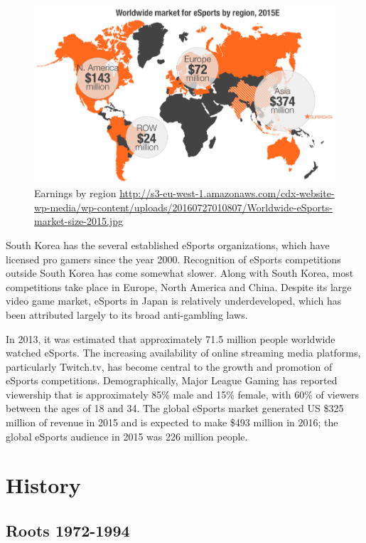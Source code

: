 \begin{figure}[!h]
	\begin{center}
		\includegraphics[width=0.68\linewidth]{images/esport_market}
		\caption{Earnings by region \url{http://s3-eu-west-1.amazonaws.com/cdx-website-wp-media/wp-content/uploads/20160727010807/Worldwide-eSports-market-size-2015.jpg}}
	\end{center}
\end{figure}
\newpage

South Korea has the several established eSports organizations, which have licensed pro gamers since the year 2000. Recognition of eSports competitions outside South Korea has come somewhat slower. Along with South Korea, most competitions take place in Europe, North America and China. Despite its large video game market, eSports in Japan is relatively underdeveloped, which has been attributed largely to its broad anti-gambling laws.



In 2013, it was estimated that approximately 71.5 million people worldwide watched eSports. The increasing availability of online streaming media platforms, particularly Twitch.tv, has become central to the growth and promotion of eSports competitions. Demographically, Major League Gaming has reported viewership that is approximately 85\% male and 15\% female, with 60\% of viewers between the ages of 18 and 34.
The global eSports market generated US \$325 million of revenue in 2015 and is expected to make \$493 million in 2016; the global eSports audience in 2015 was 226 million people.

\section{History}
	\subsection{Roots 1972-1994}
		
